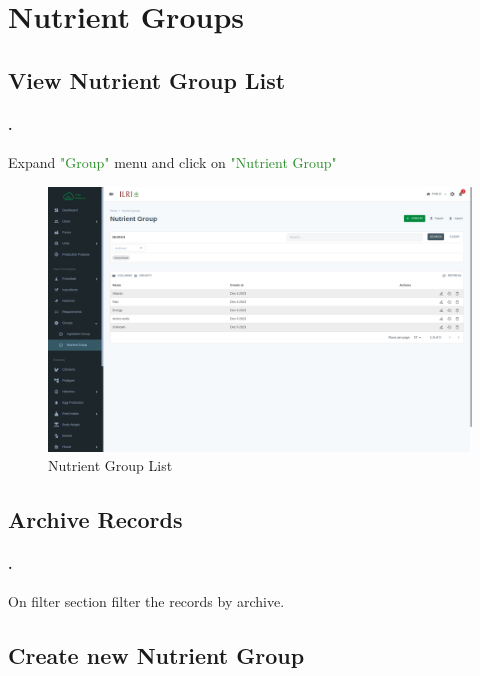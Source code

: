 \section{Nutrient Groups}\label{sec:nutrient_group}

\subsection{View Nutrient Group List}\label{sec:nutrient_group_list}
\setcounter{stepcounter}{1}
\paragraph{.}Expand \textcolor{ForestGreen}{"Group"} menu and click on \textcolor{ForestGreen}{"Nutrient Group"}
\begin{figure}[h!]
  	\includegraphics[width=15cm]{screenshots/nutrient_group_list_page.png}
  	\caption{Nutrient Group List}
  	\label{fig:nutrient_group_list_page}
\end{figure}

\subsection{Archive Records}\label{sec:nutrient_group_list_archived}
\setcounter{stepcounter}{1}
\paragraph{.}On filter section filter the records by archive.

\subsection{Create new Nutrient Group}\label{sec:nutrient_group_create}
\setcounter{stepcounter}{1}
